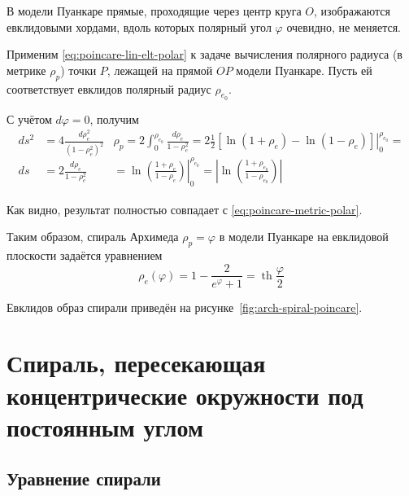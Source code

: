\documentclass{article}
\numberwithin{equation}{section}
\renewcommand{\phi}{\varphi}
\renewcommand{\th}{\operatorname{th}}
\providecommand{\abs}[1]{\left \lvert{#1}\right \rvert}
\begin{document}
В модели Пуанкаре прямые, проходящие через центр круга $O$,
изображаются евклидовыми хордами, вдоль которых полярный угол $\phi$
очевидно, не меняется.

Применим \eqref{eq:poincare-lin-elt-polar} к задаче вычисления
полярного радиуса (в метрике $\rho_p$) точки $P$, лежащей на прямой
$OP$ модели Пуанкаре. Пусть ей соответствует евклидов полярный радиус
$\rho_{e_0}$.

С учётом $d\phi=0$, получим
\begin{subequations}
  \begin{equation*}
    \begin{split}
      ds^2&=4\frac{d\rho_e^2}{(1-\rho_e^2)^2} \\
      ds &= 2\frac{d\rho_e}{1-\rho_e^2} \\
    \end{split}
  \end{equation*}
  \begin{multline*}
    \rho_p = 2\int_0^{\rho_{e_0}} \frac{d\rho_e}{1-\rho_e^2} =
     2 \frac{1}{2} \left . \left [ \ln(1+\rho_e) - \ln(1-\rho_e)
       \right ] \right \rvert_0^{\rho_{e_0}} = \\
     = \left . \ln{\left( \frac{1+\rho_e}{1-\rho_e} \right)} \right
     \rvert_0^{\rho_{e_0}} =
     \abs{ \ln{\left(\frac{1+\rho_{e_0}}{1-\rho_{e_0}} \right)}}
  \end{multline*}
\end{subequations}

Как видно, результат полностью совпадает с
\eqref{eq:poincare-metric-polar}.

Таким образом, спираль Архимеда $\rho_p = \phi$ в модели Пуанкаре на
евклидовой плоскости задаётся уравнением
\begin{equation}\label{eq:arch-spiral-poincare}
  \rho_e(\phi) = 1 - \frac{2}{e^\phi+1} = \th\frac{\phi}{2}
\end{equation}



Евклидов образ спирали приведён на рисунке \ref{fig:arch-spiral-poincare}.
\clearpage
\section{Спираль, пересекающая концентрические окружности под постоянным углом}

\subsection{Уравнение спирали}
\end{document}
